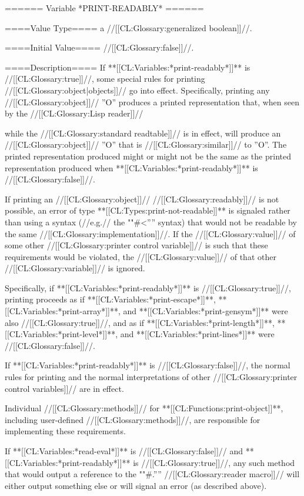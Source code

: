 ====== Variable *PRINT-READABLY* ======

====Value Type====
a //[[CL:Glossary:generalized boolean]]//.

====Initial Value====
//[[CL:Glossary:false]]//.

====Description====
If **[[CL:Variables:*print-readably*]]** is //[[CL:Glossary:true]]//, some special rules for printing //[[CL:Glossary:object|objects]]// go into effect. Specifically, printing any //[[CL:Glossary:object]]// ''O'' produces a printed representation that, when seen by the //[[CL:Glossary:Lisp reader]]//

while the //[[CL:Glossary:standard readtable]]// is in effect, will produce an //[[CL:Glossary:object]]// ''O'' that is //[[CL:Glossary:similar]]// to ''O''. The printed representation produced might or might not be the same as the printed representation produced when **[[CL:Variables:*print-readably*]]** is //[[CL:Glossary:false]]//.

If printing an //[[CL:Glossary:object]]// //[[CL:Glossary:readably]]// is not possible, an error of type **[[CL:Types:print-not-readable]]** is signaled rather than using a syntax (//e.g.// the ""#<'''' syntax) that would not be readable by the same //[[CL:Glossary:implementation]]//. If the //[[CL:Glossary:value]]// of some other //[[CL:Glossary:printer control variable]]// is such that these requirements would be violated, the //[[CL:Glossary:value]]// of that other //[[CL:Glossary:variable]]// is ignored.

Specifically, if **[[CL:Variables:*print-readably*]]** is //[[CL:Glossary:true]]//, printing proceeds as if **[[CL:Variables:*print-escape*]]**, **[[CL:Variables:*print-array*]]**, and **[[CL:Variables:*print-gensym*]]** were also //[[CL:Glossary:true]]//, and as if **[[CL:Variables:*print-length*]]**, **[[CL:Variables:*print-level*]]**, and **[[CL:Variables:*print-lines*]]** were //[[CL:Glossary:false]]//.

If **[[CL:Variables:*print-readably*]]** is //[[CL:Glossary:false]]//, the normal rules for printing and the normal interpretations of other //[[CL:Glossary:printer control variables]]// are in effect.

Individual //[[CL:Glossary:methods]]// for **[[CL:Functions:print-object]]**, including user-defined //[[CL:Glossary:methods]]//, are responsible for implementing these requirements.

If **[[CL:Variables:*read-eval*]]** is //[[CL:Glossary:false]]// and **[[CL:Variables:*print-readably*]]** is //[[CL:Glossary:true]]//, any such method that would output a reference to the ""#.'''' //[[CL:Glossary:reader macro]]// will either output something else or will signal an error (as described above).

